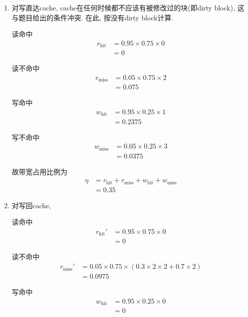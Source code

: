 \begin{solve}
  \begin{enumerate}
  \item 对写直达cache, cache在任何时候都不应该有被修改过的块(即dirty
    block), 这与题目给出的条件冲突. 在此, 按没有dirty block计算.

    读命中
    \begin{align*}
      r_{\mathrm{hit}} &= 0.95 \times 0.75 \times 0\\
      &= 0
    \end{align*}


    读不命中 
    \begin{align*}
      r_{\mathrm{miss}} &= 0.05 \times 0.75 \times 2\\
      &= 0.075
    \end{align*}
    
    写命中 
    \begin{align*}
      w_{\mathrm{hit}} &= 0.95 \times 0.25 \times 1\\
      &= 0.2375
    \end{align*}
    
    写不命中
    \begin{align*}
      w_{\mathrm{miss}} &= 0.05 \times 0.25 \times 3\\
      &= 0.0375
    \end{align*}

    故带宽占用比例为
    \begin{align*}
      \eta &= r_{\mathrm{hit}} + r_{\mathrm{miss}} + w_{\mathrm{hit}}
      + w_{\mathrm{miss}}\\
      &= 0.35
    \end{align*}
  \item 对写回cache,

    读命中
    \begin{align*}
      r_{\mathrm{hit}}' &= 0.95 \times 0.75 \times 0\\
      &= 0
    \end{align*}


    读不命中 
    \begin{align*}
      r_{\mathrm{miss}}' &= 0.05 \times 0.75 \times (0.3 \times 2
      \times 2 + 0.7 \times 2)\\
      &= 0.0975
    \end{align*}
    
    写命中 
    \begin{align*}
      w_{\mathrm{hit}} &= 0.95 \times 0.25 \times 0\\
      &= 0
    \end{align*}
    

\end{enumerate}
\end{solve}
